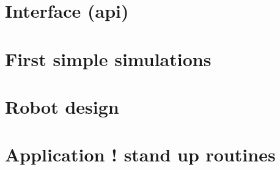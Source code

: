 \section{Interface (api)}

\section{First simple simulations}

\section{Robot design}

\section{Application ! stand up routines}